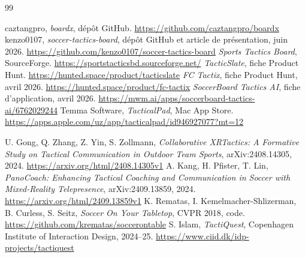 \documentclass[11pt,a4paper]{article}
\begin{document}
\newpage
\begin{thebibliography}{99}
\small
\setlength{\itemsep}{2pt}

 caztangpro, \emph{boardx}, dépôt GitHub. \url{https://github.com/caztangpro/boardx}
 kenzo0107, \emph{soccer-tactics-board}, dépôt GitHub et article de présentation, juin 2026. \url{https://github.com/kenzo0107/soccer-tactics-board}
 \emph{Sports Tactics Board}, SourceForge. \url{https://sportstacticsbd.sourceforge.net/}
 \emph{TacticSlate}, fiche Product Hunt. \url{https://hunted.space/product/tacticslate}
 \emph{FC Tactix}, fiche Product Hunt, avril 2026. \url{https://hunted.space/product/fc-tactix}
 \emph{SoccerBoard Tactics AI}, fiche d'application, avril 2026. \url{https://mwm.ai/apps/soccerboard-tactics-ai/6762029244}
 Temma Software, \emph{TacticalPad}, Mac App Store. \url{https://apps.apple.com/uz/app/tacticalpad/id946927077?mt=12}

 U. Gong, Q. Zhang, Z. Yin, S. Zollmann, \emph{Collaborative XRTactics: A Formative Study on Tactical Communication in Outdoor Team Sports}, arXiv:2408.14305, 2024. \url{https://arxiv.org/html/2408.14305v1}
 A. Kang, H. Pfister, T. Lin, \emph{PanoCoach: Enhancing Tactical Coaching and Communication in Soccer with Mixed-Reality Telepresence}, arXiv:2409.13859, 2024. \url{https://arxiv.org/html/2409.13859v1}
 K. Rematas, I. Kemelmacher-Shlizerman, B. Curless, S. Seitz, \emph{Soccer On Your Tabletop}, CVPR 2018, code. \url{https://github.com/krematas/soccerontable}
 S. Islam, \emph{TactiQuest}, Copenhagen Institute of Interaction Design, 2024--25. \url{https://www.ciid.dk/idp-projects/tactiquest}


\end{thebibliography}
\end{document}
